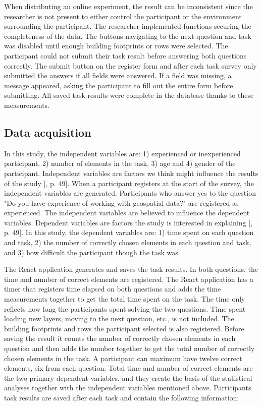 When distributing an online experiment, the result can be inconsistent since the researcher is not present to either control the participant or the environment surrounding the participant. The researcher implemented functions securing the completeness of the data. The buttons navigating to the next question and task was disabled until enough building footprints or rows were selected. The participant could not submit their task result before answering both questions correctly. The submit button on the register form and after each task survey only submitted the answers if all fields were answered. If a field was missing, a message appeared, asking the participant to fill out the entire form before submitting. All saved task results were complete in the database thanks to these measurements.

\subsection{Data acquisition}
In this study, the independent variables are: 1) experienced or inexperienced participant, 2) number of elements in the task, 3) age and 4) gender of the participant.  Independent variables are factors we think might influence the results of the study [\citep{Kitchin2000}, p. 49]. When a participant registers at the start of the survey, the independent variables are generated. Participants who answer yes to the question "Do you have experience of working with geospatial data?" are registered as experienced. The independent variables are believed to influence the dependent variables. Dependent variables are factors the study is interested in explaining [\citep{Kitchin2000}, p. 49]. In this study, the dependent variables are: 1) time spent on each question and task, 2) the number of correctly chosen elements in each question and task, and 3) how difficult the participant though the task was. 

The React application generates and saves the task results. In both questions, the time and number of correct elements are registered. The React application has a timer that registers time elapsed on both questions and adds the time measurements together to get the total time spent on the task. The time only reflects how long the participants spent solving the two questions. Time spent loading new layers, moving to the next question, etc., is not included. The building footprints and rows the participant selected is also registered. Before saving the result it counts the number of correctly chosen elements in each question and then adds the number together to get the total number of correctly chosen elements in the task. A participant can maximum have twelve correct elements, six from each question. Total time and number of correct elements are the two primary dependent variables, and they create the basis of the statistical analyses together with the independent variables mentioned above. Participants task results are saved after each task and contain the following information:

